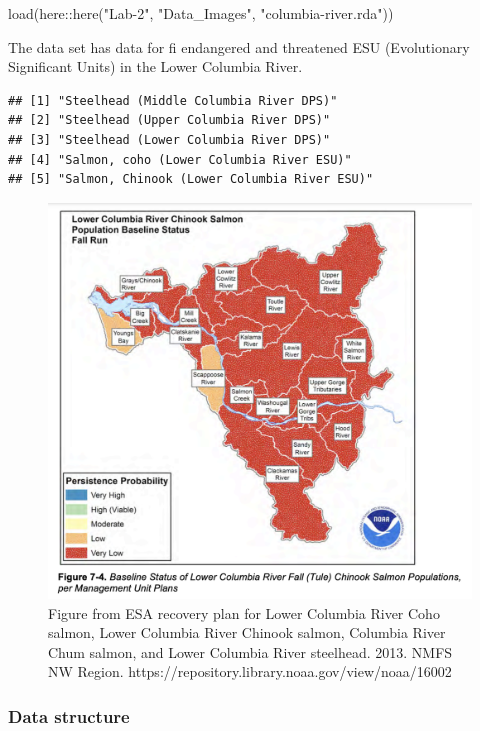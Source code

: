 \documentclass[
]{article}
\newenvironment{Shaded}{\begin{snugshade}}{\end{snugshade}}
\newcommand{\FunctionTok}[1]{\textcolor[rgb]{0.00,0.00,0.00}{#1}}
\newcommand{\NormalTok}[1]{#1}
\newcommand{\OtherTok}[1]{\textcolor[rgb]{0.56,0.35,0.01}{#1}}
\newcommand{\SpecialCharTok}[1]{\textcolor[rgb]{0.00,0.00,0.00}{#1}}
\newcommand{\StringTok}[1]{\textcolor[rgb]{0.31,0.60,0.02}{#1}}
\begin{document}
\begin{Shaded}
\begin{Highlighting}[]
\FunctionTok{load}\NormalTok{(here}\SpecialCharTok{::}\FunctionTok{here}\NormalTok{(}\StringTok{"Lab{-}2"}\NormalTok{, }\StringTok{"Data\_Images"}\NormalTok{, }\StringTok{"columbia{-}river.rda"}\NormalTok{))}
\end{Highlighting}
\end{Shaded}

The data set has data for fi endangered and threatened ESU (Evolutionary
Significant Units) in the Lower Columbia River.

\begin{Shaded}
\end{Shaded}

\begin{verbatim}
## [1] "Steelhead (Middle Columbia River DPS)"     
## [2] "Steelhead (Upper Columbia River DPS)"      
## [3] "Steelhead (Lower Columbia River DPS)"      
## [4] "Salmon, coho (Lower Columbia River ESU)"   
## [5] "Salmon, Chinook (Lower Columbia River ESU)"
\end{verbatim}

\begin{figure}
\includegraphics[width=0.5\linewidth]{Data_Images/LCR-chinook-regions} \caption{Figure from ESA recovery plan for Lower Columbia River Coho salmon, Lower Columbia River Chinook salmon, Columbia River Chum salmon, and Lower Columbia River steelhead. 2013. NMFS NW Region.  https://repository.library.noaa.gov/view/noaa/16002}\label{fig:unnamed-chunk-4}
\end{figure}

\hypertarget{data-structure}{%
\subsubsection{Data structure}\label{data-structure}}
\end{document}

